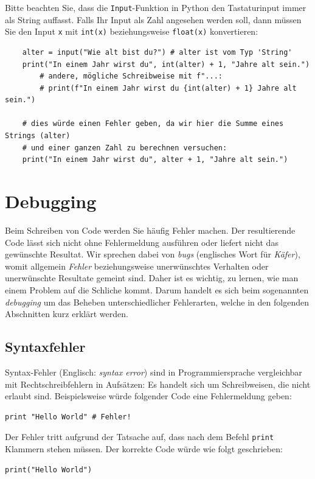 \begin{myremark}\label{myremark:input_takes_string}
	Bitte beachten Sie, dass die \lstinline{Input}-Funktion in Python den Tastaturinput immer als String auffasst. Falls Ihr Input als Zahl angesehen werden soll, dann müssen Sie den Input \lstinline|x| mit \lstinline|int(x)| beziehungsweise \lstinline|float(x)| konvertieren:
	\begin{lstlisting}
	alter = input("Wie alt bist du?") # alter ist vom Typ 'String'
	print("In einem Jahr wirst du", int(alter) + 1, "Jahre alt sein.")
		# andere, mögliche Schreibweise mit f"...:
		# print(f"In einem Jahr wirst du {int(alter) + 1} Jahre alt sein.")
	
	# dies würde einen Fehler geben, da wir hier die Summe eines Strings (alter)
	# und einer ganzen Zahl zu berechnen versuchen:
	print("In einem Jahr wirst du", alter + 1, "Jahre alt sein.")
	\end{lstlisting}
\end{myremark}


\section{Debugging}
Beim Schreiben von Code werden Sie häufig Fehler machen. Der resultierende Code lässt sich nicht ohne Fehlermeldung ausführen oder liefert nicht das gewünschte Resultat. Wir sprechen dabei von \emph{bugs} (englisches Wort für \emph{Käfer}), womit allgemein \emph{Fehler} beziehungsweise unerwünschtes Verhalten oder unerwünschte Resultate gemeint sind. Daher ist es wichtig, zu lernen, wie man einem Problem auf die Schliche kommt. Darum handelt es sich beim sogenannten \emph{debugging} um das Beheben unterschiedlicher Fehlerarten, welche in den folgenden Abschnitten kurz erklärt werden.

\subsection{Syntaxfehler}
Syntax-Fehler (Englisch: \emph{syntax error}) sind in Programmiersprache vergleichbar mit Rechtschreibfehlern in Aufsätzen: Es handelt sich um Schreibweisen, die nicht erlaubt sind. Beispielsweise würde folgender Code eine Fehlermeldung geben:

\begin{lstlisting}
print "Hello World" # Fehler!
\end{lstlisting}
Der Fehler tritt aufgrund der Tatsache auf, dass nach dem Befehl \lstinline|print| Klammern stehen müssen. Der korrekte Code würde wie folgt geschrieben:
\begin{lstlisting}
print("Hello World")
\end{lstlisting}

